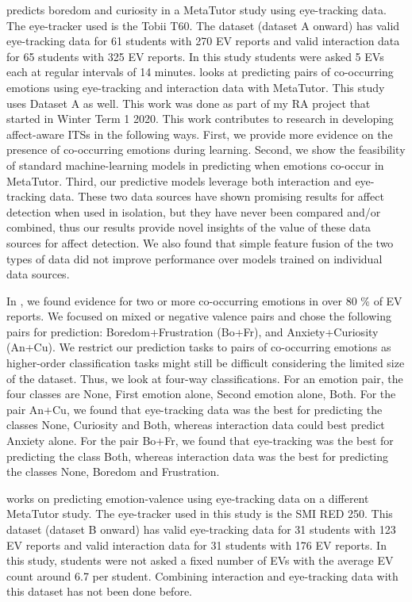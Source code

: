 \documentclass[10pt,letterpaper]{article}
\begin{document}
\cite{jaques2014predicting} predicts boredom and curiosity in a MetaTutor study using eye-tracking data. The eye-tracker used is the Tobii T60. The dataset (dataset A onward) has valid eye-tracking data for 61 students with 270 EV reports and valid interaction data for 65 students with 325 EV reports. In this study students were asked 5 EVs each at regular intervals of 14 minutes.
\cite{lalle2021predict} looks at predicting pairs of co-occurring emotions using eye-tracking and interaction data with MetaTutor. This study uses Dataset A as well. This work was done as part of my RA project that started in Winter Term 1 2020. This work contributes to research in developing affect-aware ITSs in the following ways. First, we provide more evidence on the presence of co-occurring emotions during learning. Second, we show the feasibility of standard machine-learning models in predicting when emotions co-occur in MetaTutor. Third, our predictive models leverage both interaction and eye-tracking data. These two data sources have shown promising results for affect detection when used in isolation, but they have never been compared and/or combined, thus our results provide novel insights of the value of these data sources for affect detection. We also found that simple feature fusion of the two types of data did not improve performance over models trained on individual data sources.

In \cite{lalle2021predict}, we found evidence for two or more co-occurring emotions in over 80 \% of EV reports. We focused on mixed or negative valence pairs and chose the following pairs for prediction: Boredom+Frustration (Bo+Fr), and Anxiety+Curiosity (An+Cu). We restrict our prediction tasks to pairs of co-occurring emotions as higher-order classification tasks might still be difficult considering the limited size of the dataset. Thus, we look at four-way classifications. For an emotion pair, the four classes are None, First emotion alone, Second emotion alone, Both. For the pair An+Cu, we found that eye-tracking data was the best for predicting the classes None, Curiosity and Both, whereas interaction data could best predict Anxiety alone. For the pair Bo+Fr, we found that eye-tracking was the best for predicting the class Both, whereas interaction data was the best for predicting the classes None, Boredom and Frustration.

\cite{lalle2018prediction} works on predicting emotion-valence using eye-tracking data on a different MetaTutor study. The eye-tracker used in this study is the SMI RED 250. This dataset (dataset B onward) has valid eye-tracking data for 31 students with 123 EV reports and valid interaction data for 31 students with 176 EV reports. In this study, students were not asked a fixed number of EVs with the average EV count around 6.7 per student. Combining interaction and eye-tracking data with this dataset has not been done before.
\end{document}
